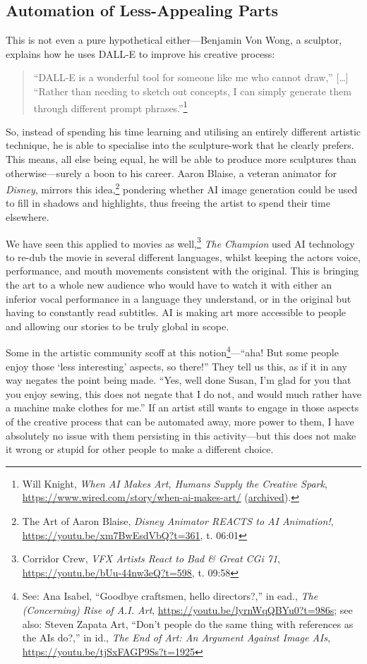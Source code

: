 \documentclass[11pt]{article}
\begin{document}
\subsection*{Automation of Less-Appealing Parts}
\label{sec:orgc258a84}
This is not even a pure hypothetical either---Benjamin Von Wong, a sculptor, explains how he uses DALL-E to improve his creative process:
\begin{quote}
“DALL-E is a wonderful tool for someone like me who cannot draw,” [\ldots{}] “Rather than needing to sketch out concepts, I can simply generate them through different prompt phrases.”\footnote{Will Knight, \emph{When AI Makes Art, Humans Supply the Creative Spark}, \url{https://www.wired.com/story/when-ai-makes-art/} (\href{https://archive.ph/8ATKK}{archived}).}
\end{quote}

So, instead of spending his time learning and utilising an entirely different artistic technique, he is able to specialise into the sculpture-work that he clearly prefers. This means, all else being equal, he will be able to produce more sculptures than otherwise---surely a boon to his career. Aaron Blaise, a veteran animator for \emph{Disney}, mirrors this idea,\footnote{The Art of Aaron Blaise, \emph{Disney Animator REACTS to AI Animation!}, \url{https://youtu.be/xm7BwEsdVbQ?t=361}, t. 06:01} pondering whether AI image generation could be used to fill in shadows and highlights, thus freeing the artist to spend their time elsewhere.

We have seen this applied to movies as well,\footnote{Corridor Crew, \emph{VFX Artists React to Bad \& Great CGi 71}, \url{https://youtu.be/bUu-44nw3eQ?t=598}, t. 09:58} \emph{The Champion} used AI technology to re-dub the movie in several different languages, whilst keeping the actors voice, performance, and mouth movements consistent with the original. This is bringing the art to a whole new audience who would have to watch it with either an inferior vocal performance in a language they understand, or in the original but having to constantly read subtitles. AI is making art more accessible to people and allowing our stories to be truly global in scope.

Some in the artistic community scoff at this notion\footnote{See: Ana Isabel, ``Goodbye craftsmen, hello directors?,'' in ead., \emph{The (Concerning) Rise of A.I. Art}, \url{https://youtu.be/lyrnWqQBYu0?t=986s}; see also: Steven Zapata Art, ``Don’t people do the same thing with references as the AIs do?,'' in id., \emph{The End of Art: An Argument Against Image AIs}, \url{https://youtu.be/tjSxFAGP9Ss?t=1925}}---``aha! But some people enjoy those `less interesting' aspects, so there!'' They tell us this, as if it in any way negates the point being made. ``Yes, well done Susan, I'm glad for you that you enjoy sewing, this does not negate that I do not, and would much rather have a machine make clothes for me.'' If an artist still wants to engage in those aspects of the creative process that can be automated away, more power to them, I have absolutely no issue with them persisting in this activity---but this does not make it wrong or stupid for other people to make a different choice.
\end{document}
